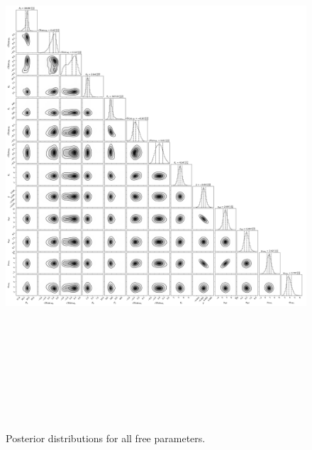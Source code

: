 \documentclass{emulateapj}
\begin{document}
 
\begin{figure}[!h]
\centering

\includegraphics[height=8.0in,width=6.0in,keepaspectratio]{TOI-1751_default_corner.pdf}
\caption{Posterior distributions for all free parameters.}
\end{figure} 

 
\end{document}
